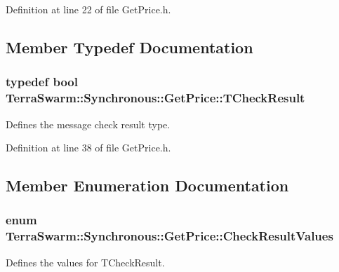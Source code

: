 Definition at line 22 of file Get\-Price.\-h.



\subsection{Member Typedef Documentation}
\hypertarget{class_terra_swarm_1_1_synchronous_1_1_get_price_a174c0399b878132f69b36c99ec7a09b4}{
\subsubsection[{T\-Check\-Result}]{\setlength{\rightskip}{0pt plus 5cm}typedef bool {\bf Terra\-Swarm\-::\-Synchronous\-::\-Get\-Price\-::\-T\-Check\-Result}}}\label{class_terra_swarm_1_1_synchronous_1_1_get_price_a174c0399b878132f69b36c99ec7a09b4}


Defines the message check result type. 



Definition at line 38 of file Get\-Price.\-h.



\subsection{Member Enumeration Documentation}
\hypertarget{class_terra_swarm_1_1_synchronous_1_1_get_price_ace12fb126447b011bb7f0e39522e3798}{
\subsubsection[{Check\-Result\-Values}]{\setlength{\rightskip}{0pt plus 5cm}enum {\bf Terra\-Swarm\-::\-Synchronous\-::\-Get\-Price\-::\-Check\-Result\-Values}}}\label{class_terra_swarm_1_1_synchronous_1_1_get_price_ace12fb126447b011bb7f0e39522e3798}


Defines the values for T\-Check\-Result. 

